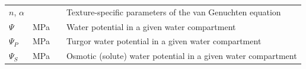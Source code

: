 \documentclass[]{book}
\begin{document}
\begin{longtable}[]{@{}llll@{}}
\begin{minipage}[t]{0.11\columnwidth}
\(n\), \(\alpha\)\strut
\end{minipage} & \begin{minipage}[t]{0.10\columnwidth}\raggedright
\strut
\end{minipage} & \begin{minipage}[t]{0.12\columnwidth}\raggedright
\strut
\end{minipage} & \begin{minipage}[t]{0.45\columnwidth}\raggedright
Texture-specific parameters of the van Genuchten equation\strut
\end{minipage}\tabularnewline
\begin{minipage}[t]{0.11\columnwidth}\raggedright
\(\Psi\)\strut
\end{minipage} & \begin{minipage}[t]{0.10\columnwidth}\raggedright
MPa\strut
\end{minipage} & \begin{minipage}[t]{0.12\columnwidth}\raggedright
\strut
\end{minipage} & \begin{minipage}[t]{0.45\columnwidth}\raggedright
Water potential in a given water compartment\strut
\end{minipage}\tabularnewline
\begin{minipage}[t]{0.11\columnwidth}\raggedright
\(\Psi_P\)\strut
\end{minipage} & \begin{minipage}[t]{0.10\columnwidth}\raggedright
MPa\strut
\end{minipage} & \begin{minipage}[t]{0.12\columnwidth}\raggedright
\strut
\end{minipage} & \begin{minipage}[t]{0.45\columnwidth}\raggedright
Turgor water potential in a given water compartment\strut
\end{minipage}\tabularnewline
\begin{minipage}[t]{0.11\columnwidth}\raggedright
\(\Psi_S\)\strut
\end{minipage} & \begin{minipage}[t]{0.10\columnwidth}\raggedright
MPa\strut
\end{minipage} & \begin{minipage}[t]{0.12\columnwidth}\raggedright
\strut
\end{minipage} & \begin{minipage}[t]{0.45\columnwidth}\raggedright
Osmotic (solute) water potential in a given water compartment\strut

\end{minipage}
\end{longtable}
\end{document}
